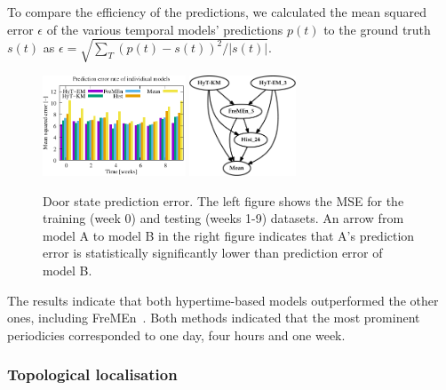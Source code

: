To compare the efficiency of the predictions, we calculated the mean squared error $\epsilon$ of the various temporal models' predictions $p(t)$ to the ground truth $s(t)$ as $\epsilon=\sqrt{\sum_T{(p(t)-s(t))^2}/|s(t)|}$.
%
\begin{figure}[!ht]
   \begin{center}
      \hfill
      \includegraphics[height=3.0cm]{fig/door_graph}
      \hfill
      \includegraphics[height=3.0cm]{fig/door_stat}
      \hfill
      \caption{Door state prediction error. The left figure shows the MSE for the training (week 0) and testing (weeks 1-9) datasets. An arrow from model A to model B in the right figure indicates that A's prediction error is statistically significantly lower than prediction error of model B.\label{fig:binary}}
   \end{center}
\end{figure}
%
The results indicate that both hypertime-based models outperformed the other ones, including FreMEn~\cite{krajnik2017fremen}.
Both methods indicated that the most prominent periodicies corresponded to one day, four hours and one week. 

\subsubsection{Topological localisation}

